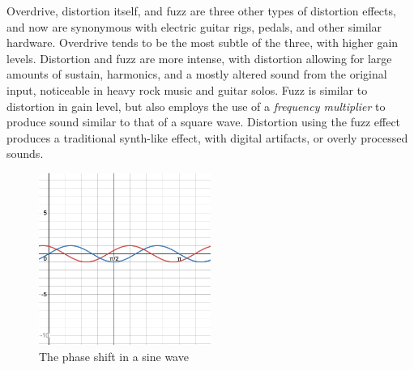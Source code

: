 Overdrive, distortion itself, and fuzz are three other types of distortion effects, and now are synonymous with electric guitar rigs, pedals, and other similar hardware. Overdrive tends to be the most subtle of the three, with higher gain levels. Distortion and fuzz are more intense, with distortion allowing for large amounts of sustain, harmonics, and a mostly altered sound from the original input, noticeable in heavy rock music and guitar solos. Fuzz is similar to distortion in gain level, but also employs the use of a \textit{frequency multiplier} to produce sound similar to that of a square wave. Distortion using the fuzz effect produces a traditional synth-like effect, with digital artifacts, or overly processed sounds.

\begin{figure}
	\centering
	\includegraphics[width=0.5\textwidth]{figures/sine-wave-phase-shift.png}
	\caption{The phase shift in a sine wave}
	\label{fig:sine-wave-phase-shift}
\end{figure}

